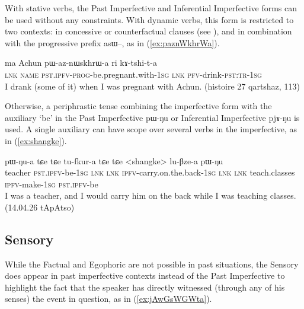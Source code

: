 \documentclass[oldfontcommands,oneside,a4paper,11pt]{article}
\newcommand{\ipa}[1]{{\phon \mbox{#1}}} %
\newcommand{\refb}[1]{(\ref{#1})}
\begin{document}
With stative verbs, the Past Imperfective and Inferential Imperfective forms can be used without any constraints. With dynamic verbs, this form is restricted to two contexts: in concessive or counterfactual clauses (see \citealt[298]{jacques14linking}), and in combination with the progressive prefix \ipa{asɯ--}, as in \refb{ex:paznWkhrWa}.

\begin{exe}
\ex \label{ex:paznWkhrWa}
\gll 
\ipa{ma} 	Achun 	\ipa{pɯ-az-nɯskhrɯ-a} 	\ipa{ri} 	\ipa{kɤ-tshi-t-a} \\
\textsc{lnk} \textsc{name} \textsc{pst.ipfv-prog}-be.pregnant.with-\textsc{1sg} \textsc{lnk} \textsc{pfv}-drink-\textsc{pst:tr-1sg} \\
\glt I drank (some of it) when I was pregnant with Achun. (histoire 27 qartshaz, 113)
\end{exe}

Otherwise, a periphrastic tense combining the imperfective form with the auxiliary `be' in the Past Imperfective \ipa{pɯ-ŋu} or Inferential Imperfective \ipa{pjɤ-ŋu}  is used.   A single auxiliary  can have scope over several verbs in the imperfective, as in \refb{ex:shangke}.

\begin{exe}
\ex \label{ex:shangke}
\gll  \ipa{sloχpɯn} 	\ipa{pɯ-ŋu-a} 	\ipa{tɕe} 	\ipa{tɕe} 	\ipa{tu-fkur-a} 	\ipa{tɕe} 	\ipa{tɕe} 	 <shangke> 	\ipa{lu-βze-a} 	\ipa{pɯ-ŋu} \\
teacher \textsc{pst.ipfv}-be-\textsc{1sg} \textsc{lnk}  \textsc{lnk} \textsc{ipfv}-carry.on.the.back-\textsc{1sg} \textsc{lnk}  \textsc{lnk}  teach.classes \textsc{ipfv}-make-\textsc{1sg} \textsc{pst.ipfv}-be \\
\glt I was a teacher, and I would carry him on the back while I was teaching classes. (14.04.26 tApAtso)
\end{exe}


\subsection{Sensory}  \label{sec:pst:sens}
While the Factual and Egophoric are not possible in past situations, the Sensory does appear in past imperfective contexts instead of the Past Imperfective to highlight the fact that the speaker  has directly witnessed (through any of his senses) the event in question, as in \refb{ex:jAwGsWGWta}. 
\end{document}
